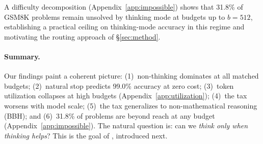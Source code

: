 
A difficulty decomposition (Appendix~\ref{app:impossible}) shows that
31.8\% of GSM8K problems remain unsolved by thinking mode at budgets
up to $b{=}512$, establishing a practical ceiling on thinking-mode
accuracy in this regime and motivating the routing approach of
\S\ref{sec:method}.

\paragraph{Summary.}
Our findings paint a coherent picture:
(1)~non-thinking dominates at all matched budgets;
(2)~natural stop predicts 99.0\% accuracy at zero cost;
(3)~token utilization collapses at high budgets (Appendix~\ref{app:utilization});
(4)~the tax worsens with model scale;
(5)~the tax generalizes to non-mathematical reasoning (BBH); and
(6)~31.8\% of problems are beyond reach at any budget (Appendix~\ref{app:impossible}).
The natural question is: can we \emph{think only when thinking helps}?
This is the goal of \method{}, introduced next.

